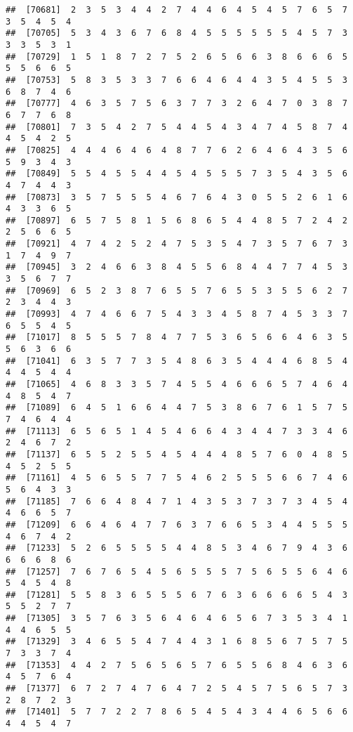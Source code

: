 \documentclass[
]{book}
\begin{document}
\begin{verbatim}
##  [70681]  2  3  5  3  4  4  2  7  4  4  6  4  5  4  5  7  6  5  7  3  5  4  5  4
##  [70705]  5  3  4  3  6  7  6  8  4  5  5  5  5  5  5  4  5  7  3  3  3  5  3  1
##  [70729]  1  5  1  8  7  2  7  5  2  6  5  6  6  3  8  6  6  6  5  5  5  6  6  5
##  [70753]  5  8  3  5  3  3  7  6  6  4  6  4  4  3  5  4  5  5  3  6  8  7  4  6
##  [70777]  4  6  3  5  7  5  6  3  7  7  3  2  6  4  7  0  3  8  7  6  7  7  6  8
##  [70801]  7  3  5  4  2  7  5  4  4  5  4  3  4  7  4  5  8  7  4  4  5  4  2  5
##  [70825]  4  4  4  6  4  6  4  8  7  7  6  2  6  4  6  4  3  5  6  5  9  3  4  3
##  [70849]  5  5  4  5  5  4  4  5  4  5  5  5  7  3  5  4  3  5  6  4  7  4  4  3
##  [70873]  3  5  7  5  5  5  4  6  7  6  4  3  0  5  5  2  6  1  6  4  3  3  6  5
##  [70897]  6  5  7  5  8  1  5  6  8  6  5  4  4  8  5  7  2  4  2  2  5  6  6  5
##  [70921]  4  7  4  2  5  2  4  7  5  3  5  4  7  3  5  7  6  7  3  1  7  4  9  7
##  [70945]  3  2  4  6  6  3  8  4  5  5  6  8  4  4  7  7  4  5  3  3  5  6  7  7
##  [70969]  6  5  2  3  8  7  6  5  5  7  6  5  5  3  5  5  6  2  7  2  3  4  4  3
##  [70993]  4  7  4  6  6  7  5  4  3  3  4  5  8  7  4  5  3  3  7  6  5  5  4  5
##  [71017]  8  5  5  5  7  8  4  7  7  5  3  6  5  6  6  4  6  3  5  5  6  3  6  6
##  [71041]  6  3  5  7  7  3  5  4  8  6  3  5  4  4  4  6  8  5  4  4  4  5  4  4
##  [71065]  4  6  8  3  3  5  7  4  5  5  4  6  6  6  5  7  4  6  4  4  8  5  4  7
##  [71089]  6  4  5  1  6  6  4  4  7  5  3  8  6  7  6  1  5  7  5  7  4  6  4  4
##  [71113]  6  5  6  5  1  4  5  4  6  6  4  3  4  4  7  3  3  4  6  2  4  6  7  2
##  [71137]  6  5  5  2  5  5  4  5  4  4  4  8  5  7  6  0  4  8  5  4  5  2  5  5
##  [71161]  4  5  6  5  5  7  7  5  4  6  2  5  5  5  6  6  7  4  6  5  6  4  3  3
##  [71185]  7  6  6  4  8  4  7  1  4  3  5  3  7  3  7  3  4  5  4  4  6  6  5  7
##  [71209]  6  6  4  6  4  7  7  6  3  7  6  6  5  3  4  4  5  5  5  4  6  7  4  2
##  [71233]  5  2  6  5  5  5  5  4  4  8  5  3  4  6  7  9  4  3  6  6  6  6  8  6
##  [71257]  7  6  7  6  5  4  5  6  5  5  5  7  5  6  5  5  6  4  6  5  4  5  4  8
##  [71281]  5  5  8  3  6  5  5  5  6  7  6  3  6  6  6  6  5  4  3  5  5  2  7  7
##  [71305]  3  5  7  6  3  5  6  4  6  4  6  5  6  7  3  5  3  4  1  4  4  6  5  5
##  [71329]  3  4  6  5  5  4  7  4  4  3  1  6  8  5  6  7  5  7  5  7  3  3  7  4
##  [71353]  4  4  2  7  5  6  5  6  5  7  6  5  5  6  8  4  6  3  6  4  5  7  6  4
##  [71377]  6  7  2  7  4  7  6  4  7  2  5  4  5  7  5  6  5  7  3  2  8  7  2  3
##  [71401]  5  7  7  2  2  7  8  6  5  4  5  4  3  4  4  6  5  6  6  4  4  5  4  7

\end{verbatim}
\end{document}
